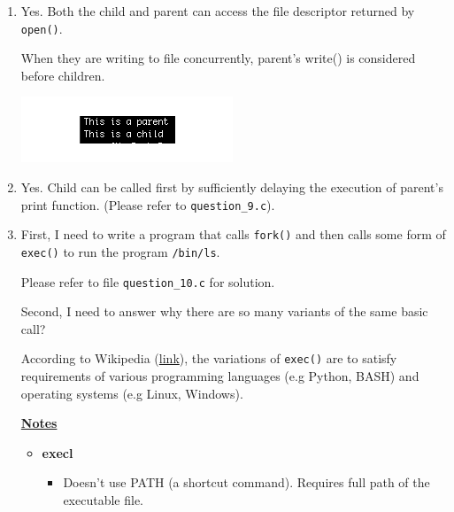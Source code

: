 \documentclass[12pt]{article}
\begin{document}
\begin{enumerate}[1.]
    \item

    Yes. Both the child and parent can access the file descriptor returned by \texttt{open()}.

    \bigskip

    When they are writing to file concurrently, parent's write() is considered before children.

    \bigskip

    \begin{center}
    \includegraphics[width=0.5\linewidth]{images/worksheet_2_solution_16.png}
    \end{center}

    \item

    Yes. Child can be called first by sufficiently delaying the execution of parent's print function.
    (Please refer to \texttt{question\_9.c}).

    \item

    First, I need to write a program that calls \texttt{fork()} and then calls some
    form of \texttt{exec()} to run the program \texttt{/bin/ls}.

    \bigskip

    Please refer to file \texttt{question\_10.c} for solution.

    \bigskip

    Second, I need to answer why there are so many variants of the same basic call?

    \bigskip

    According to Wikipedia (\href{https://en.wikipedia.org/wiki/Exec_(system_call)#C_language_prototypes}{link}),
    the variations of \texttt{exec()} are to satisfy requirements of various programming languages (e.g Python, BASH)
    and operating systems (e.g Linux, Windows).

    \bigskip

    \underline{\textbf{Notes}}

    \bigskip

    \begin{itemize}
        \item \textbf{execl}

        \begin{itemize}
            \item Doesn't use PATH (a shortcut command). Requires full path of the executable file.


\end{itemize}
\end{itemize}
\end{enumerate}
\end{document}
